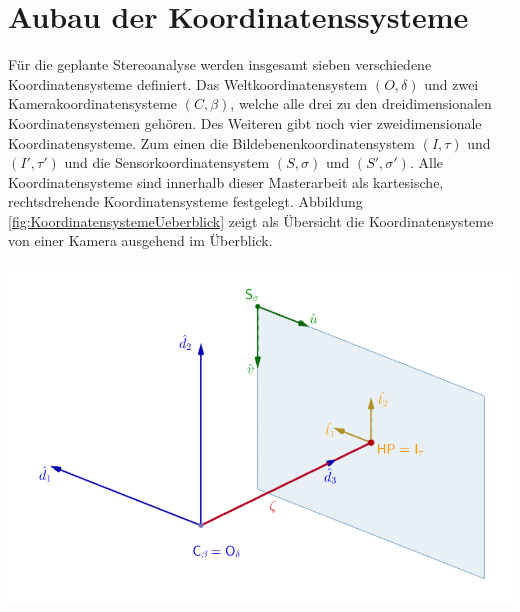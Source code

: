 \section{Aubau der Koordinatenssysteme}

		
Für die geplante Stereoanalyse werden insgesamt sieben verschiedene Koordinatensysteme definiert. Das Weltkoordinatensystem $(O,\delta)$ und zwei Kamerakoordinatensysteme $(C,\beta)$, welche alle drei zu den dreidimensionalen Koordinatensystemen gehören. Des Weiteren gibt noch vier zweidimensionale Koordinatensysteme. Zum einen die Bildebenenkoordinatensystem $(I,\tau)$ und $(I',\tau')$ und die Sensorkoordinatensystem $(S,\sigma)$ und $(S',\sigma')$. Alle Koordinatensysteme sind innerhalb dieser Masterarbeit als kartesische, rechtsdrehende Koordinatensysteme festgelegt. Abbildung \ref{fig:KoordinatensystemeUeberblick} zeigt als Übersicht die Koordinatensysteme von einer Kamera ausgehend im Überblick. \\

	\begin{minipage}{\linewidth}
	\centering
	\includegraphics[width=0.8\linewidth]{images/UebersichtKoordinatensysteme_beschriftet.png}
	\label{fig:KoordinatensystemeUeberblick}
\end{minipage}\\ \\

